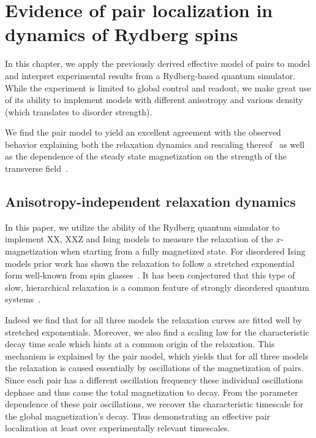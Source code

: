 \chapter{Evidence of pair localization in dynamics of Rydberg spins}\label{ch:experimental-pairs}

In this chapter, we apply the previously derived effective model of pairs to model and interpret experimental results from a Rydberg-based quantum simulator. While the experiment is limited to global control and readout, we make great use of its ability to implement models with different anisotropy and various density (which translates to disorder strength).

We find the pair model to yield  an excellent agreement with the observed behavior explaining both the relaxation dynamics and rescaling thereof~\cite{franzObservationUniversalRelaxation2023} as well as the dependence of the steady state magnetization on the strength of the transverse field~\cite{franzEmergentPairLocalization2022}.


\section{Anisotropy-independent relaxation dynamics}
In this paper, we utilize the ability of the Rydberg quantum simulator to implement XX, XXZ and Ising models to measure the relaxation of the $x$-magnetization when starting from a fully magnetized state. For disordered Ising models prior work has shown the relaxation to follow a stretched exponential form well-known from spin glasses~\cite{breyStretchedExponentialDecay1993,signolesGlassyDynamicsDisordered2021,schultzenGlassyQuantumDynamics2022,schultzenSemiclassicalSimulationsPredict2022}. It has been conjectured that this type of slow, hierarchical relaxation is a common feature of strongly disordered quantum systems~\cite{haldarSlowDynamicsKohlrausch2023}.

Indeed we find that for all three models the relaxation curves are fitted well by stretched exponentials. Moreover, we also find a scaling law for the characteristic decay time scale which hints at a common origin of the relaxation. This mechanism is explained by the pair model, which yields that for all three models the relaxation is caused essentially by oscillations of the magnetization of pairs. Since each pair has a different oscillation frequency these individual oscillations dephase and thus cause the total magnetization to decay. From the parameter dependence of these pair oscillations, we recover the characteristic timescale for the global magnetization's decay. Thus demonstrating an effective pair localization at least over experimentally relevant timescales.

